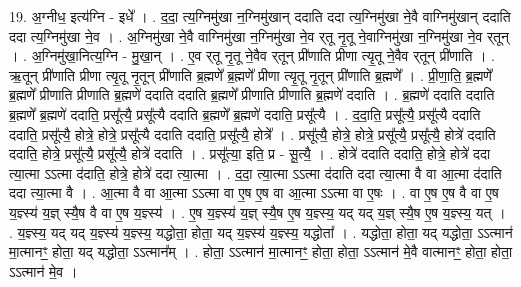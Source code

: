 \documentclass[17pt]{extarticle}
\begin{document}
19. अ॒ग्नीध॒ इत्य॑ग्नि - इधे᳚ । . द॒दा॒ त्य॒ग्निमु॑खा न॒ग्निमु॑खान् ददाति ददा त्य॒ग्निमु॑खा ने॒वै वाग्निमु॑खान् ददाति ददा त्य॒ग्निमु॑खा ने॒व । . अ॒ग्निमु॑खा ने॒वै वाग्निमु॑खा न॒ग्निमु॑खा ने॒व र्‌तू नृ॒तू ने॒वाग्निमु॑खा न॒ग्निमु॑खा ने॒व र्‌तून् । . अ॒ग्निमु॑खा॒नित्य॒ग्नि - मु॒खा॒न् । . ए॒व र्‌तू नृ॒तू ने॒वैव र्‌तून् प्री॑णाति प्रीणा त्यृ॒तू ने॒वैव र्‌तून् प्री॑णाति । . ऋ॒तून् प्री॑णाति प्रीणा त्यृ॒तू नृ॒तून् प्री॑णाति ब्र॒ह्मणे᳚ ब्र॒ह्मणे᳚ प्रीणा त्यृ॒तू नृ॒तून् प्री॑णाति ब्र॒ह्मणे᳚ । . प्री॒णा॒ति॒ ब्र॒ह्मणे᳚ ब्र॒ह्मणे᳚ प्रीणाति प्रीणाति ब्र॒ह्मणे॑ ददाति ददाति ब्र॒ह्मणे᳚ प्रीणाति प्रीणाति ब्र॒ह्मणे॑ ददाति । . ब्र॒ह्मणे॑ ददाति ददाति ब्र॒ह्मणे᳚ ब्र॒ह्मणे॑ ददाति॒ प्रसू᳚त्यै॒ प्रसू᳚त्यै ददाति ब्र॒ह्मणे᳚ ब्र॒ह्मणे॑ ददाति॒ प्रसू᳚त्यै । . द॒दा॒ति॒ प्रसू᳚त्यै॒ प्रसू᳚त्यै ददाति ददाति॒ प्रसू᳚त्यै॒ होत्रे॒ होत्रे॒ प्रसू᳚त्यै ददाति ददाति॒ प्रसू᳚त्यै॒ होत्रे᳚ । . प्रसू᳚त्यै॒ होत्रे॒ होत्रे॒ प्रसू᳚त्यै॒ प्रसू᳚त्यै॒ होत्रे॑ ददाति ददाति॒ होत्रे॒ प्रसू᳚त्यै॒ प्रसू᳚त्यै॒ होत्रे॑ ददाति । . प्रसू᳚त्या॒ इति॒ प्र - सू॒त्यै॒ । . होत्रे॑ ददाति ददाति॒ होत्रे॒ होत्रे॑ ददा त्या॒त्मा ऽऽत्मा द॑दाति॒ होत्रे॒ होत्रे॑ ददा त्या॒त्मा । . द॒दा॒ त्या॒त्मा ऽऽत्मा द॑दाति ददा त्या॒त्मा वै वा आ॒त्मा द॑दाति ददा त्या॒त्मा वै । . आ॒त्मा वै वा आ॒त्मा ऽऽत्मा वा ए॒ष ए॒ष वा आ॒त्मा ऽऽत्मा वा ए॒षः । . वा ए॒ष ए॒ष वै वा ए॒ष य॒ज्ञ्स्य॑ य॒ज्ञ् स्यै॒ष वै वा ए॒ष य॒ज्ञ्स्य॑ । . ए॒ष य॒ज्ञ्स्य॑ य॒ज्ञ् स्यै॒ष ए॒ष य॒ज्ञ्स्य॒ यद् यद् य॒ज्ञ् स्यै॒ष ए॒ष य॒ज्ञ्स्य॒ यत् । . य॒ज्ञ्स्य॒ यद् यद् य॒ज्ञ्स्य॑ य॒ज्ञ्स्य॒ यद्धोता॒ होता॒ यद् य॒ज्ञ्स्य॑ य॒ज्ञ्स्य॒ यद्धोता᳚ । . यद्धोता॒ होता॒ यद् यद्धोता॒ ऽऽत्मान॑ मा॒त्मानꣳ॒॒ होता॒ यद् यद्धोता॒ ऽऽत्मान᳚म् । . होता॒ ऽऽत्मान॑ मा॒त्मानꣳ॒॒ होता॒ होता॒ ऽऽत्मान॑ मे॒वै वात्मानꣳ॒॒ होता॒ होता॒ ऽऽत्मान॑ मे॒व । \newline
\end{document}
